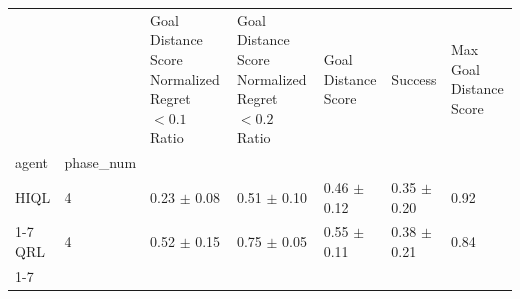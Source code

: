 \begin{tabular}{lllllll}
\toprule
 &  & Goal Distance Score Normalized Regret $< 0.1$ Ratio & Goal Distance Score Normalized Regret $< 0.2$ Ratio & Goal Distance Score & Success & Max Goal Distance Score \\
agent & phase_num &  &  &  &  &  \\
\midrule
HIQL & 4 & 0.23 $\pm$ 0.08 & 0.51 $\pm$ 0.10 & 0.46 $\pm$ 0.12 & 0.35 $\pm$ 0.20 & 0.92 \\
\cline{1-7}
QRL & 4 & 0.52 $\pm$ 0.15 & 0.75 $\pm$ 0.05 & 0.55 $\pm$ 0.11 & 0.38 $\pm$ 0.21 & 0.84 \\
\cline{1-7}
\bottomrule
\end{tabular}
